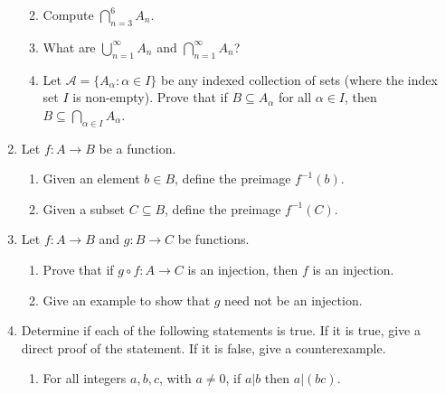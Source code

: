 \documentclass[12pt]{article}
\newcommand{\points}[1]{\marginpar{\hspace{24pt}[#1]}}
\newcommand{\di}{\displaystyle}
\begin{document}
\begin{enumerate}
\begin{enumerate}
\vspace{1.25in}

 \item Compute $\di \bigcap_{n=3}^6 A_n$. \points{2}

\vspace{1.25in}

 \item What are $\di \bigcup_{n=1}^\infty A_n$ and $\di \bigcap_{n=1}^\infty A_n$? \points{2}

\vspace{1.5in}

 \item Let $\mathcal{A} = \{A_\alpha : \alpha\in I\}$ be any indexed collection of sets (where the index set $I$ is  non-empty). Prove that if $B\subseteq A_\alpha$ for all $\alpha\in I$, then $B\subseteq \bigcap_{\alpha\in I}A_\alpha$. \points{4}
\end{enumerate}
\newpage

\item Let $f:A\to B$ be a function.
\begin{enumerate}
 \item Given an element $b\in B$, define the preimage $f^{-1}(b)$. \points{2}

\vspace{1in}

 \item Given a subset $C\subseteq B$, define the preimage $f^{-1}(C)$. \points{1}

\vspace{1in}

\end{enumerate}
\item Let $f:A\to B$ and $g:B\to C$ be functions.
\begin{enumerate}
 \item Prove that if $g\circ f:A\to C$ is an injection, then $f$ is an injection.  \points{5}

\vspace{3in}

 \item Give an example to show that $g$ need not be an injection.\points{2}
\end{enumerate}
\newpage

\item Determine if each of the following statements is true. If it is true, give a direct proof of the statement. If it is false, give a counterexample.
\begin{enumerate}
 \item For all integers $a,b,c$, with $a\neq 0$, if $a|b$ then $a|(bc)$. \points{3}


\end{enumerate}
\end{enumerate}
\end{document}
